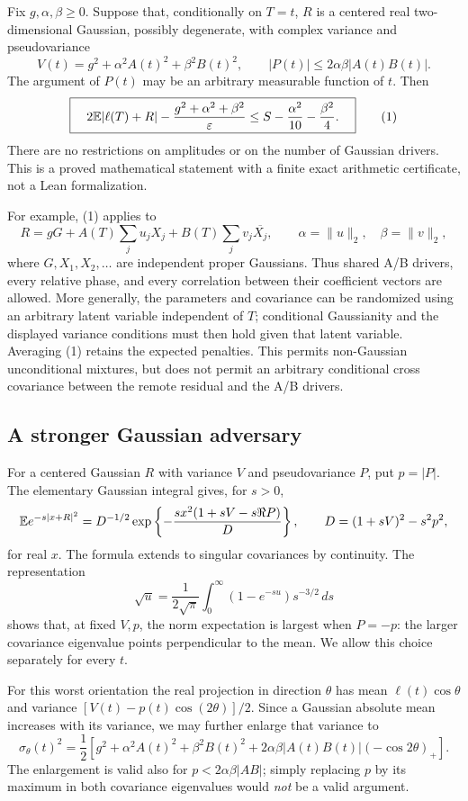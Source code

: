 \begin{theorem}\label{polar:main}
Fix $g,\alpha,\beta\ge0$. Suppose that, conditionally on $T=t$,
$R$ is a centered real two-dimensional Gaussian, possibly degenerate,
with complex variance and pseudovariance
\[
 V(t)=g^2+\alpha^2 A(t)^2+\beta^2 B(t)^2,
 \qquad |P(t)|\le 2\alpha\beta |A(t)B(t)|.
\]
The argument of $P(t)$ may be an arbitrary measurable function of $t$.
Then
\[
 \boxed{\quad
 2\mathbb E|\ell(T)+R|-\frac{g^2+\alpha^2+\beta^2}{\varepsilon}
 \le S-\frac{\alpha^2}{10}-\frac{\beta^2}{4}.
 \quad}                                                   \tag{1}
\]
There are no restrictions on amplitudes or on the number of Gaussian
drivers. This is a proved mathematical statement with a finite exact
arithmetic certificate, not a Lean formalization.
\end{theorem}

For example, (1) applies to
\[
 R=gG+A(T)\sum_j u_jX_j+B(T)\sum_jv_j\overline{X_j},
 \qquad \alpha=\|u\|_2,\quad\beta=\|v\|_2,
\]
where $G,X_1,X_2,\ldots$ are independent proper Gaussians. Thus shared
A/B drivers, every relative phase, and every correlation between their
coefficient vectors are allowed. More generally, the parameters and
covariance can be randomized using an arbitrary latent variable
independent of $T$; conditional Gaussianity and the displayed variance
conditions must then hold given that latent variable. Averaging (1)
retains the expected penalties. This permits non-Gaussian unconditional
mixtures, but does not permit an arbitrary conditional cross covariance
between the remote residual and the A/B drivers.

\subsection{A stronger Gaussian adversary}

For a centered Gaussian $R$ with variance $V$ and pseudovariance $P$,
put $p=|P|$. The elementary Gaussian integral gives, for $s>0$,
\[
 \mathbb E e^{-s|x+R|^2}
 =D^{-1/2}\exp\left\{-\frac{s x^2(1+sV-s\Re P)}D\right\},
 \qquad D=(1+sV)^2-s^2p^2,
\]
for real $x$. The formula extends to singular covariances by continuity.
The representation
\[
 \sqrt u=\frac1{2\sqrt\pi}\int_0^\infty(1-e^{-su})s^{-3/2}\,ds
\]
shows that, at fixed $V,p$, the norm expectation is largest when $P=-p$:
the larger covariance eigenvalue points perpendicular to the mean.
We allow this choice separately for every $t$.

For this worst orientation the real projection in direction $\theta$
has mean $\ell(t)\cos\theta$ and variance
$[V(t)-p(t)\cos(2\theta)]/2$. Since a Gaussian absolute mean increases
with its variance, we may further enlarge that variance to
\[
 \sigma_\theta(t)^2=\frac12\left[
 g^2+\alpha^2A(t)^2+\beta^2B(t)^2
 +2\alpha\beta|A(t)B(t)|(-\cos2\theta)_+\right].             \tag{2}
\]
The enlargement is valid also for $p<2\alpha\beta|AB|$; simply replacing
$p$ by its maximum in both covariance eigenvalues would \emph{not} be a
valid argument.

